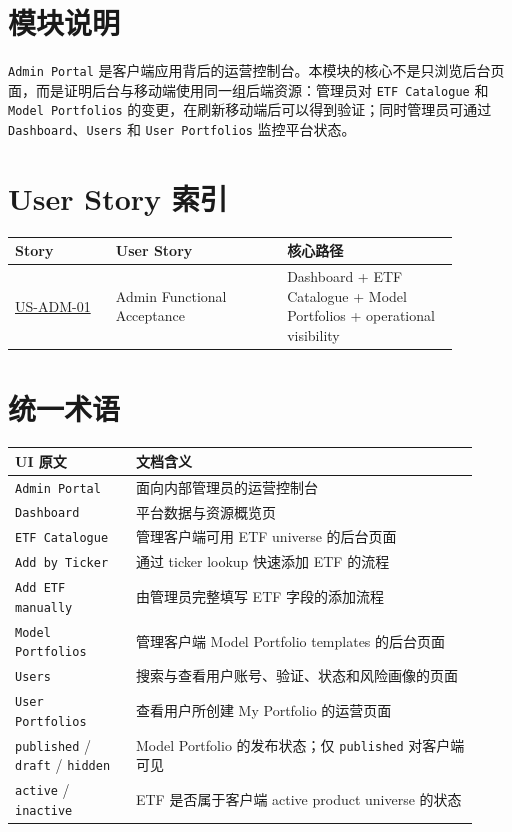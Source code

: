 \section{模块说明}
\texttt{Admin Portal} 是客户端应用背后的运营控制台。本模块的核心不是只浏览后台页面，而是证明后台与移动端使用同一组后端资源：管理员对 \texttt{ETF Catalogue} 和 \texttt{Model Portfolios} 的变更，在刷新移动端后可以得到验证；同时管理员可通过 \texttt{Dashboard}、\texttt{Users} 和 \texttt{User Portfolios} 监控平台状态。
\section{User Story 索引}
\begingroup
\small
\begin{longtable}{L{0.20\linewidth}L{0.34\linewidth}L{0.34\linewidth}}
\toprule
\textbf{Story} & \textbf{User Story} & \textbf{核心路径} \\
\midrule
\hyperlink{us-adm-01}{US-ADM-01} & Admin Functional Acceptance & Dashboard + ETF Catalogue + Model Portfolios + operational visibility \\
\bottomrule
\end{longtable}
\endgroup
\section{统一术语}
\begingroup
\small
\begin{longtable}{L{0.24\linewidth}L{0.68\linewidth}}
\toprule
\textbf{UI 原文} & \textbf{文档含义} \\
\midrule
\texttt{Admin Portal} & 面向内部管理员的运营控制台 \\
\texttt{Dashboard} & 平台数据与资源概览页 \\
\texttt{ETF Catalogue} & 管理客户端可用 ETF universe 的后台页面 \\
\texttt{Add by Ticker} & 通过 ticker lookup 快速添加 ETF 的流程 \\
\texttt{Add ETF manually} & 由管理员完整填写 ETF 字段的添加流程 \\
\texttt{Model Portfolios} & 管理客户端 Model Portfolio templates 的后台页面 \\
\texttt{Users} & 搜索与查看用户账号、验证、状态和风险画像的页面 \\
\texttt{User Portfolios} & 查看用户所创建 My Portfolio 的运营页面 \\
\texttt{published} /\allowbreak{} \texttt{draft} /\allowbreak{} \texttt{hidden} & Model Portfolio 的发布状态；仅 \texttt{published} 对客户端可见 \\
\texttt{active} /\allowbreak{} \texttt{inactive} & ETF 是否属于客户端 active product universe 的状态 \\
\bottomrule
\end{longtable}
\endgroup
\prdhr
\hypertarget{us-adm-01}{}
